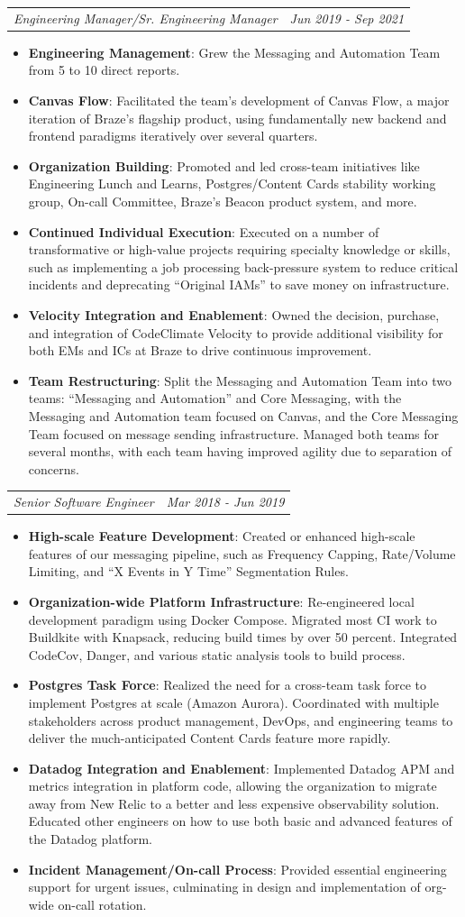 \documentclass[letterpaper,10pt]{article}
\makeatletter
\newcommand{\resumeItem}[2]{
  \item\small{
    \textbf{#1}{: #2 \vspace{-2pt}}
  }
}
\newcommand{\resumeSubSubheading}[2]{
    \begin{tabular*}{0.97\textwidth}{l@{\extracolsep{\fill}}r}
      \textit{\small#1} & \textit{\small #2} \\
    \end{tabular*}\vspace{-5pt}
}
\newcommand{\resumeItemListStart}{\begin{itemize}}
\newcommand{\resumeItemListEnd}{\end{itemize}\vspace{-5pt}}
\makeatother
\begin{document}
    \resumeSubSubheading
      {Engineering Manager/Sr. Engineering Manager}{Jun 2019 - Sep 2021}
       \resumeItemListStart
        \resumeItem{Engineering Management}
          {Grew the Messaging and Automation Team from 5 to 10 direct reports.}
        \resumeItem{Canvas Flow}
          {Facilitated the team's development of Canvas Flow, a major iteration of Braze's flagship product, using fundamentally new backend and frontend paradigms iteratively over several quarters.}
        \resumeItem{Organization Building}
          {Promoted and led cross-team initiatives like Engineering Lunch and Learns, Postgres/Content Cards stability working group, On-call Committee, Braze's Beacon product system, and more.}
        \resumeItem{Continued Individual Execution}
          {Executed on a number of transformative or high-value projects requiring specialty knowledge or skills, such as implementing a job processing back-pressure system to reduce critical incidents and deprecating ``Original IAMs'' to save money on infrastructure.}
        \resumeItem{Velocity Integration and Enablement}
          {Owned the decision, purchase, and integration of CodeClimate Velocity to provide additional visibility for both EMs and ICs at Braze to drive continuous improvement.}
        \resumeItem{Team Restructuring}
          {Split the Messaging and Automation Team into two teams: ``Messaging and Automation'' and Core Messaging, with the Messaging and Automation team focused on Canvas, and the Core Messaging Team focused on message sending infrastructure. Managed both teams for several months, with each team having improved agility due to separation of concerns.}
      \resumeItemListEnd
      
    \resumeSubSubheading
      {Senior Software Engineer}{Mar 2018 - Jun 2019}
      \resumeItemListStart
        \resumeItem{High-scale Feature Development}
          {Created or enhanced high-scale features of our messaging pipeline, such as Frequency Capping, Rate/Volume Limiting, and ``X Events in Y Time'' Segmentation Rules.}
        \resumeItem{Organization-wide Platform Infrastructure}
          {Re-engineered local development paradigm using Docker Compose. Migrated most CI work to Buildkite with Knapsack, reducing build times by over 50 percent. Integrated CodeCov, Danger, and various static analysis tools to build process.}
        \resumeItem{Postgres Task Force}
          {Realized the need for a cross-team task force to implement Postgres at scale (Amazon Aurora). Coordinated with multiple stakeholders across product management, DevOps, and engineering teams to deliver the much-anticipated Content Cards feature more rapidly.}
        \resumeItem{Datadog Integration and Enablement}
          {Implemented Datadog APM and metrics integration in platform code, allowing the organization to migrate away from New Relic to a better and less expensive observability solution. Educated other engineers on how to use both basic and advanced features of the Datadog platform.}
        \resumeItem{Incident Management/On-call Process}
          {Provided essential engineering support for urgent issues, culminating in design and implementation of org-wide on-call rotation.}
      \resumeItemListEnd
\end{document}
